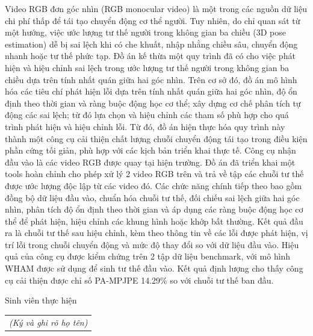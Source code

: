 \documentclass[../DoAn.tex]{subfiles}
\begin{document}
Video RGB đơn góc nhìn (RGB monocular video) là một trong các nguồn dữ liệu chi phí thấp để tái tạo chuyển động cơ thể người. Tuy nhiên, do chỉ quan sát từ một hướng, việc ước lượng tư thế người trong không gian ba chiều (3D pose estimation) dễ bị sai lệch khi có che khuất, nhập nhằng chiều sâu, chuyển động nhanh hoặc tư thế phức tạp.
Đồ án kế thừa một quy trình đã có cho việc phát hiện và hiệu chỉnh sai lệch trong ước lượng tư thế người trong không gian ba chiều dựa trên tính nhất quán giữa hai góc nhìn. Trên cơ sở đó, đồ án mô hình hóa các tiêu chí phát hiện lỗi dựa trên tính nhất quán giữa hai góc nhìn, độ ổn định theo thời gian và ràng buộc động học cơ thể; xây dựng cơ chế phân tích tự động các sai lệch; từ đó lựa chọn và hiệu chỉnh các tham số phù hợp cho quá trình phát hiện và hiệu chỉnh lỗi.
Từ đó, đồ án hiện thực hóa quy trình này thành một công cụ cải thiện chất lượng chuỗi chuyển động tái tạo trong điều kiện phần cứng tối giản, phù hợp với các kịch bản triển khai thực tế.
Công cụ nhận đầu vào là các video RGB được quay tại hiện trường. Đồ án đã triển khai một tools hoàn chỉnh cho phép xử lý 2 video RGB trên và trả về tập các chuỗi tư thế được ước lượng độc lập từ các video đó. Các chức năng chính tiếp theo bao gồm đồng bộ dữ liệu đầu vào, chuẩn hóa chuỗi tư thế, đối chiếu sai lệch giữa hai góc nhìn, phân tích độ ổn định theo thời gian và áp dụng các ràng buộc động học cơ thể để phát hiện, hiệu chỉnh các khung hình hoặc khớp bất thường. Kết quả đầu ra là chuỗi tư thế sau hiệu chỉnh, kèm theo thông tin về các lỗi được phát hiện, vị trí lỗi trong chuỗi chuyển động và mức độ thay đổi so với dữ liệu đầu vào.  
Hiệu quả của công cụ được kiểm chứng trên 2 tập dữ liệu benchmark, với mô hình WHAM được sử dụng để sinh tư thế đầu vào. Kết quả định lượng cho thấy công cụ cải thiện được chỉ số PA-MPJPE 14.29\% so với chuỗi tư thế ban đầu. 

\begin{flushright}
Sinh viên thực hiện\\
\begin{tabular}{@{}c@{}}
\textit{(Ký và ghi rõ họ tên)}
\end{tabular}
\end{flushright}
\end{document}
